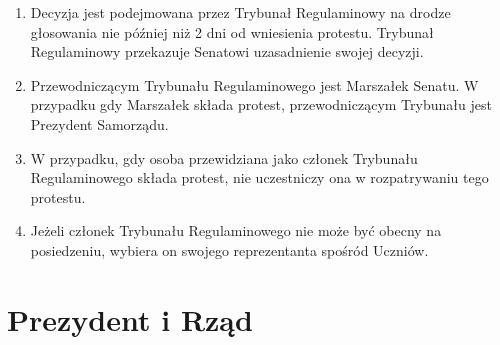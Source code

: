 \documentclass[14pt]{article}
\newenvironment{ustepy}{%
	\begin{enumerate}[leftmargin=1.5em, itemindent=1pt, labelwidth=1em, itemsep=5pt]
	}{%
	\end{enumerate}
}
\begin{document}
\begin{ustepy}
	\item Decyzja jest podejmowana przez Trybunał Regulaminowy na drodze głosowania nie później niż 2 dni od wniesienia protestu. Trybunał Regulaminowy przekazuje Senatowi uzasadnienie swojej decyzji.
	\item Przewodniczącym Trybunału Regulaminowego jest Marszałek Senatu. W przypadku gdy Marszałek składa protest, przewodniczącym Trybunału jest Prezydent Samorządu.
	\item W przypadku, gdy osoba przewidziana jako członek Trybunału Regulaminowego składa protest, nie uczestniczy ona w rozpatrywaniu tego protestu.
	\item Jeżeli członek Trybunału Regulaminowego nie może być obecny na posiedzeniu, wybiera on swojego reprezentanta spośród Uczniów.
\end{ustepy}
\newpage
\section{Prezydent i Rząd}
\end{document}
